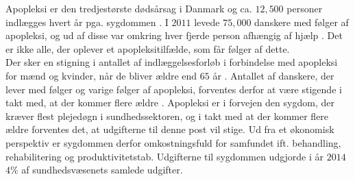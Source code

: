 Apopleksi er den tredjestørste dødsårsag i Danmark og ca. $12,500$ personer indlægges hvert år pga. sygdommen \cite{Hjernesagen2015a}. %
I $2011$ levede $75,000$ danskere med følger af apopleksi, og ud af disse var omkring hver fjerde person afhængig af hjælp \cite{Hjernesagen2015a}. Det er ikke alle, der oplever et apopleksitilfælde, som får følger af dette. \\
Der sker en stigning i antallet af indlæggelsesforløb i forbindelse med apopleksi for mænd og kvinder, når de bliver ældre end $65$ år \cite{Sundhedsstyrelsen2011}. Antallet af danskere, der lever med følger og varige følger af apopleksi, forventes derfor at være stigende i takt med, at der kommer flere ældre \cite{Sagen2014}. Apopleksi er i forvejen den sygdom, der kræver flest plejedøgn i sundhedssektoren, og i takt med at der kommer flere ældre forventes det, at udgifterne til denne post vil stige. Ud fra et økonomisk perspektiv er sygdommen derfor omkostningsfuld for samfundet ift. behandling, rehabilitering og produktivitetstab.  Udgifterne til sygdommen udgjorde i år $2014$ $4\%$ af sundhedsvæsenets samlede udgifter. \cite{Hjernesagen2015a, Kruuse2014}
 
